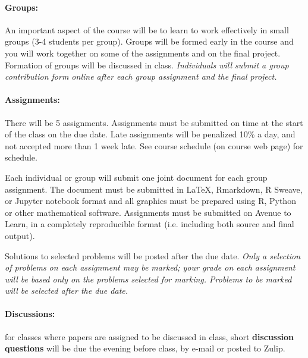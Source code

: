 \documentclass[12pt]{article}
\newcommand{\note}{\noindent{\bfseries\slshape Note:\/} }
\begin{document}
\paragraph*{Groups:} An important aspect of the course will be to learn to work effectively in small groups (3-4 students per group).  Groups will be formed early in the course and you will work together on some of the assignments and on the final project.  Formation of groups will be discussed in class.  \emph{Individuals will submit a group contribution form online after each group assignment and the final project.}

\paragraph*{Assignments:} There will be 5 assignments.  Assignments must be submitted on time at the start of the class on the due date.  Late assignments will be penalized 10\% a day, and not accepted more than 1 week late. See course schedule (on course web page) for schedule.

\noindent
Each individual or group will submit one joint document for each group assignment.  The
document must be submitted in \LaTeX, Rmarkdown, R Sweave, or Jupyter notebook format and all graphics must be prepared
using R, Python or other mathematical software.  Assignments must be submitted on Avenue to Learn, in a completely
reproducible format (i.e. including both source and final output).

Solutions to selected problems will be posted after the due date.
\note \emph{Only a selection of problems on each assignment may be marked; your grade on each assignment will be based only on the problems selected for marking.  Problems to be marked will be selected after the due date.}




\paragraph*{Discussions:} for classes where papers are assigned to be discussed in class, short \textbf{discussion questions} will be due the evening before class, by e-mail or posted to Zulip.
\end{document}

